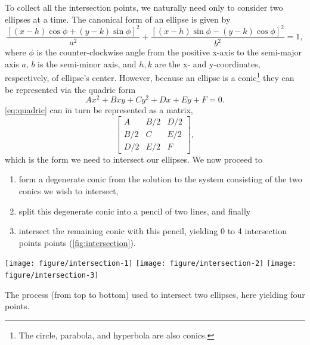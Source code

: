 \documentclass[
  oneside,
  openany,
  numbers=noendperiod,
  parskip=half,
  bibliography=totoc
]{scrbook}\usepackage[]{graphicx}\usepackage{xcolor}
\newenvironment{knitrout}{}{} %
\begin{document}
To collect all the intersection points, we naturally need only to consider two
ellipses at a time. The canonical form of an ellipse is given by
\begin{equation*}
\frac{\left[ (x-h)\cos{\phi}+(y-k)\sin{\phi} \right]^2}{a^2}+
  \frac{\left[(x-h) \sin{\phi}-(y-k) \cos{\phi}\right]^2}{b^2} = 1,
\end{equation*}
where $\phi$ is the counter-clockwise angle from the positive x-axis to the
semi-major axis $a$, $b$ is the semi-minor axis, and $h, k$ are the x- and
y-coordinates, respectively, of ellipse's center. However, because an ellipse
is a conic\footnote{The circle, parabola, and hyperbola are also conics.} they
can be represented via the quadric form
\begin{equation}
Ax^2 + Bxy + Cy^2 + Dx + Ey + F = 0.
\label{eq:quadric}
\end{equation}
\eqref{eq:quadric} can in turn be represented as a matrix,
\begin{equation*}
\begin{bmatrix}
A   & B/2 & D/2 \\
B/2 & C   & E/2 \\
D/2 & E/2 & F
\end{bmatrix},
\end{equation*}
which is the form we need to intersect our ellipses. We now proceed to
\begin{enumerate}
\item form a degenerate conic from the solution to the system consisting of the
  two conics we wish to intersect,
\item split this degenerate conic into a pencil of two lines, and finally
\item intersect the remaining conic with this pencil, yielding 0 to 4
  intersection points points (\cref{fig:intersection}).
\end{enumerate}

\begin{marginfigure}
\begin{knitrout}\small
{}\color{fgcolor}

{\centering \texttt{[image: figure/intersection-1]}
\texttt{[image: figure/intersection-2]}
\texttt{[image: figure/intersection-3]}

}



\end{knitrout}
\caption{The process (from top to bottom) used to intersect two ellipses, here
yielding four points.}
\label{fig:intersection}
\end{marginfigure}
\end{document}
